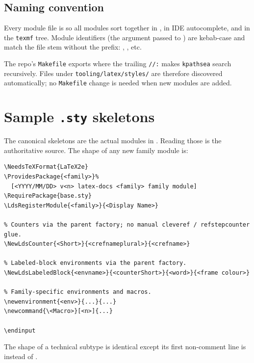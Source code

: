 \documentclass[11pt]{article}
\begin{document}
\subsection{Naming convention}

Every module file is  so all
modules sort together in , in IDE autocomplete, and in
the \texttt{texmf} tree. Module identifiers (the argument passed to
) are kebab-case and match the file stem
without the prefix: ,
, etc.

The repo's \texttt{Makefile} exports
where the trailing \texttt{//:} makes \texttt{kpathsea} search recursively.
Files under \texttt{tooling/latex/styles/} are therefore discovered
automatically; no \texttt{Makefile} change is needed when new modules are
added.

\section{Sample \texttt{.sty} skeletons}

The canonical skeletons are the actual modules in
. Reading those is the authoritative
source. The shape of any new family module is:

\begin{verbatim}
\NeedsTeXFormat{LaTeX2e}
\ProvidesPackage{<family>}%
  [<YYYY/MM/DD> v<n> latex-docs <family> family module]
\RequirePackage{base.sty}
\LdsRegisterModule{<family>}{<Display Name>}

% Counters via the parent factory; no manual cleveref / refstepcounter glue.
\NewLdsCounter{<Short>}{<crefnameplural>}{<crefname>}

% Labeled-block environments via the parent factory.
\NewLdsLabeledBlock{<envname>}{<counterShort>}{<word>}{<frame colour>}

% Family-specific environments and macros.
\newenvironment{<env>}{...}{...}
\newcommand{\<Macro>}[<n>]{...}

\endinput
\end{verbatim}

The shape of a technical subtype is identical except its first non-comment
line is 
instead of .
\end{document}
